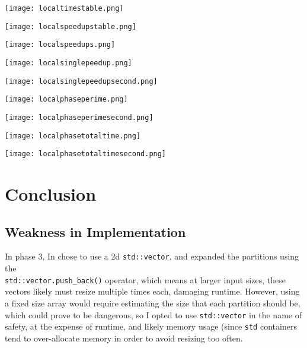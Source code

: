 \documentclass[11pt]{report}
\newcommand{\SCALE}{0.5}
\begin{document}
\begin{minipage}{\SCALE\linewidth}
\texttt{[image: localtimestable.png]}
\end{minipage}
\hfill
\begin{minipage}{\SCALE\linewidth}
\texttt{[image: localspeedupstable.png]}
\end{minipage}

\begin{minipage}{\SCALE\linewidth}
\texttt{[image: localspeedups.png]}
\end{minipage}
\hfill
\begin{minipage}{\SCALE\linewidth}
\texttt{[image: localsinglepeedup.png]}
\end{minipage}

\begin{minipage}{\SCALE\linewidth}
\texttt{[image: localsinglepeedupsecond.png]}
\end{minipage}

\begin{minipage}{\SCALE\linewidth}
\texttt{[image: localphaseperime.png]}
\end{minipage}
\hfill
\begin{minipage}{\SCALE\linewidth}
\texttt{[image: localphaseperimesecond.png]}
\end{minipage}

\begin{minipage}{\SCALE\linewidth}
\texttt{[image: localphasetotaltime.png]}
\end{minipage}
\hfill
\begin{minipage}{\SCALE\linewidth}
\texttt{[image: localphasetotaltimesecond.png]}
\end{minipage}

\section*{Conclusion}

\subsection*{Weakness in Implementation}
In phase 3, In chose to use a 2d \verb|std::vector|, and expanded the partitions using the \\ \verb|std::vector.push_back()| operator, which means at larger input sizes, these vectors likely must resize multiple times each, damaging runtime. However, using a fixed size array would require estimating the size that each partition should be, which could prove to be dangerous, so I opted to use \verb|std::vector| in the name of safety, at the expense of runtime, and likely memory usage (since \verb|std| containers tend to over-allocate memory in order to avoid resizing too often.
\end{document}
